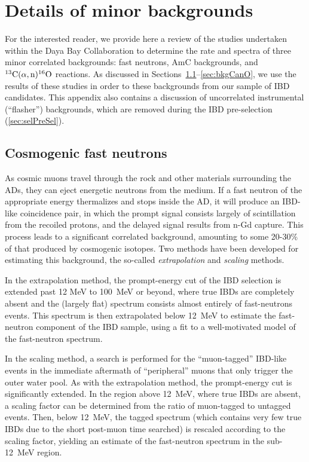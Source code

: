 \documentclass[../thesis.tex]{subfiles}
\begin{document}
\chapter{Details of minor backgrounds}
\label{chap:bkgDetails}

For the interested reader, we provide here a review of the studies undertaken within the Daya Bay Collaboration to determine the rate and spectra of three minor correlated backgrounds: fast neutrons, AmC backgrounds, and $^{13}\mathrm{C}(\alpha, \mathrm{n})^{16}\mathrm{O}$ reactions. As discussed in Sections~\ref{sec:bkgFastn}--\ref{sec:bkgCanO}, we use the results of these studies in order to these backgrounds from our sample of IBD candidates. This appendix also contains a discussion of uncorrelated instrumental (``flasher'') backgrounds, which are removed during the IBD pre-selection (\autoref{sec:selPreSel}).

\section{Cosmogenic fast neutrons}
\label{sec:bkgFastn}

As cosmic muons travel through the rock and other materials surrounding the ADs, they can eject energetic neutrons from the medium. If a fast neutron of the appropriate energy thermalizes and stops inside the AD, it will produce an IBD-like coincidence pair, in which the prompt signal consists largely of scintillation from the recoiled protons, and the delayed signal results from n-Gd capture. This process leads to a significant correlated background, amounting to some 20-30\% of that produced by cosmogenic isotopes. Two methods have been developed for estimating this background, the so-called \emph{extrapolation} and \emph{scaling} methods.

In the extrapolation method, the prompt-energy cut of the IBD selection is extended past 12 MeV to 100~MeV or beyond, where true IBDs are completely absent and the (largely flat) spectrum consists almost entirely of fast-neutrons events. This spectrum is then extrapolated below 12~MeV to estimate the fast-neutron component of the IBD sample, using a fit to a well-motivated model of the fast-neutron spectrum.

In the scaling method, a search is performed for the ``muon-tagged'' IBD-like events in the immediate aftermath of ``peripheral'' muons that only trigger the outer water pool. As with the extrapolation method, the prompt-energy cut is significantly extended. In the region above 12~MeV, where true IBDs are absent, a scaling factor can be determined from the ratio of muon-tagged to untagged events. Then, below 12~MeV, the tagged spectrum (which contains very few true IBDs due to the short post-muon time searched) is rescaled according to the scaling factor, yielding an estimate of the fast-neutron spectrum in the sub-12~MeV region.
\end{document}
